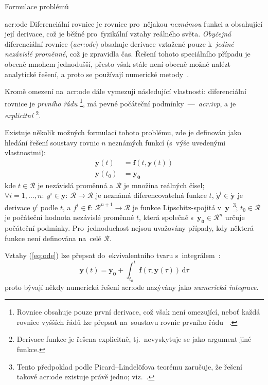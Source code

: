 \documentclass[thesis=M,czech]{FITthesis}[2012/06/26]
\newcommand{\acrlabel}[1]{acr:#1}
\newcommand{\acr}[1]{\acrshort{\acrlabel{#1}}}
\newcommand{\acrf}[1]{\acrfull{\acrlabel{#1}}}
\newcommand{\hl}[1]{\textit{#1}}
\newcommand{\name}[1]{\hl{#1}}
\newcommand{\cit}[1]{\cite{#1}}
\newcommand{\rf}[1]{\ref{#1}}
\newcommand{\rfeq}[1]{(\rf{eq:#1})}
\renewcommand{\vec}[1]{\ensuremath{\boldsymbol{#1}}}
\newcommand{\set}[1]{\ensuremath{\mathcal{#1}}}
\newcommand{\der}[1]{\ensuremath{\dot{#1}}}
\begin{document}
\begin{section}{Formulace problémů}
\begin{subsection}{\acrf{ode}}\label{ss:theory:formulation:ode}
Diferenciální rovnice je rovnice pro~nějakou \hl{neznámou} funkci
a obsahující její derivace,
což je běžné pro~fyzikální vztahy reálného světa.
\hl{Obyčejná} diferenciální rovnice (\name{\acr{ode}})
obsahuje derivace vztažené pouze
k~\hl{jediné nezávislé proměnné},
což je zpravidla čas.
Řešení tohoto speciálního případu je obecně mnohem jednodušší,
přesto však stále není obecně možné nalézt analytické řešení,
a proto se používají numerické metody~\cit{odeint-art}\cit{ode}.

Kromě omezení na~\acr{ode} dále vymezuji
následující vlastnosti:
diferenciální rovnice je \name{prvního řádu}%
\footnote{Rovnice obsahuje pouze první derivace,
což však není omezující,
neboť každá rovnice vyšších řádů
lze přepsat na~soustavu rovnic prvního řádu%
~\cit{ode-valid-runge_kutta-art}\cit{ode-lec}.},
má pevné počáteční podmínky~---~\name{\acrf{ivp}},
a je \name{explicitní}%
\footnote{Derivace funkce je řešena explicitně,
tj.~nevyskytuje se jako argument jiné funkce.}.

Existuje několik možných formulací tohoto problému,
zde je definován jako hledání řešení soustavy rovnic
$n$ neznámých funkcí
(s~výše uvedenými vlastnostmi):
\begin{equation}\label{eq:ode}
\begin{split}
   \vec{\der{y}}(t) &= \vec{f} \! \left( t, \vec{y}(t) \right) \\
   \vec{y}(t_0)     &= \vec{y_0}
\end{split}
\end{equation}
kde ${t \in \set{R}}$ je nezávislá proměnná a \set{R}
je množina reálných čísel;
${\forall i = 1,} \dots, n : \:
{y^i \in \vec{y}} : \: {\set{R} \rightarrow \set{R}}$
je neznámá diferencovatelná funkce $t$,
${\der{y}^i \in \vec{\der{y}}}$ je derivace $y^i$ podle $t$,
a ${f^i \in \vec{f}} : \: {\set{R}^{n+1} \rightarrow \set{R}}$
je funkce Lipschitz-spojitá v~\vec{y}\,%
\footnote{Tento předpoklad podle Picard--Lindelöfova teorému zaručuje,
že řešení takové \acr{ode} existuje právě jedno; viz.~\cit{ode-lec}.};
${t_0 \in \set{R}}$ je počáteční hodnota nezávislé proměnné $t$,
která společně s~${\vec{y_0} \in \set{R}^{n}}$ určuje počáteční podmínky.
Pro~jednoduchost nejsou uvažovány případy,
kdy některá funkce není definována na~celé \set{R}.

Vztahy \rfeq{ode}
lze přepsat do~ekvivalentního tvaru s~integrálem~\cit{ode-lec}:
\begin{equation}
   \vec{y}(t) = \vec{y_0} + \int_{t_0}^{t} \vec{f} \!
      \left( \tau, \vec{y}(\tau) \right) \, \text{d}\tau
\end{equation}
proto bývají někdy numerická řešení \acr{ode}
nazývány jako \name{numerická integrace}.
\end{subsection} %


\end{section} %
\end{document}

